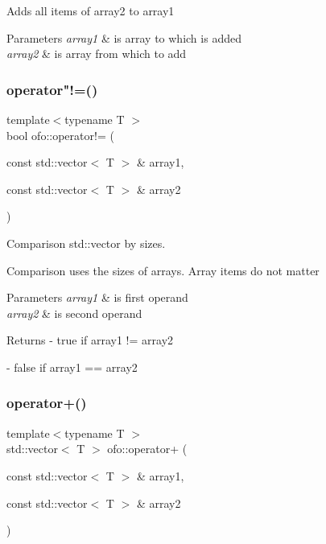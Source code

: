 Adds all items of \textquotesingle{}array2\textquotesingle{} to \textquotesingle{}array1\textquotesingle{} 
\begin{DoxyParams}{Parameters}
{\em array1} & is array to which is added \\
\hline
{\em array2} & is array from which to add \\
\hline
\end{DoxyParams}
\mbox{\label{namespaceofo_a9746f36ff374ab6299fb0f990e0e0e83}} 
\subsubsection{\texorpdfstring{operator"!=()}{operator!=()}}
{\footnotesize\ttfamily template$<$typename T $>$ \\
bool ofo\+::operator!= (\begin{DoxyParamCaption}\item[{const std\+::vector$<$ T $>$ \&}]{array1,  }\item[{const std\+::vector$<$ T $>$ \&}]{array2 }\end{DoxyParamCaption})}



Comparison std\+::vector by sizes. 

Comparison uses the sizes of arrays. Array items do not matter 
\begin{DoxyParams}{Parameters}
{\em array1} & is first operand \\
\hline
{\em array2} & is second operand \\
\hline
\end{DoxyParams}
\begin{DoxyReturn}{Returns}
-\/ true if \textquotesingle{}array1\textquotesingle{} != \textquotesingle{}array2\textquotesingle{} 

-\/ false if \textquotesingle{}array1\textquotesingle{} == \textquotesingle{}array2\textquotesingle{} 
\end{DoxyReturn}
\mbox{\label{namespaceofo_acbaf18732443a853d482cebefb9f6e98}} 
\subsubsection{\texorpdfstring{operator+()}{operator+()}}
{\footnotesize\ttfamily template$<$typename T $>$ \\
std\+::vector$<$ T $>$ ofo\+::operator+ (\begin{DoxyParamCaption}\item[{const std\+::vector$<$ T $>$ \&}]{array1,  }\item[{const std\+::vector$<$ T $>$ \&}]{array2 }\end{DoxyParamCaption})}



